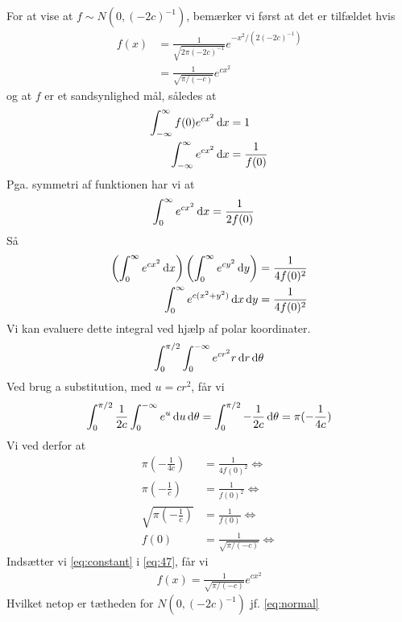 \documentclass{article} %
\begin{document}
 For at vise at \(f\sim N(0,(-2c)^{-1})\), bemærker vi først at det er tilfældet hvis
 \begin{align}
      f(x) & = \frac{1}{\sqrt{2\pi(-2c)^{-1}}}e^{-x^2/(2(-2c)^{-1})} \\
      & = \frac{1}{\sqrt{\pi/(-c)}}e^{cx^2} \label{eq:normal}
  \end{align}
og at \(f\) er et sandsynlighed mål, således at
\begin{align}
    \int_{-\infty}^\infty f(0)e^{cx^2}\dif x & = 1 \\
    \int_{-\infty}^\infty e^{cx^2}\dif x & = \frac{1}{f(0)}
\end{align}
Pga. symmetri af funktionen har vi at
\begin{align}
    \int_{0}^\infty e^{cx^2}\dif x & = \frac{1}{2f(0)}
\end{align}
Så
\begin{align}
    \left(\int_{0}^\infty e^{cx^2}\dif x\right)\left(\int_{0}^\infty e^{cy^2}\dif y\right) & = \frac{1}{4f(0)^2} \\
    \int_{0}^\infty e^{c(x^2+y^2)}\dif x \dif y & = \frac{1}{4f(0)^2}
\end{align}
Vi kan evaluere dette integral ved hjælp af polar koordinater.
\begin{align}
    \int_0^{\pi/2}\int_0^{-\infty}e^{cr^2}r\dif r\dif \theta
\end{align}
Ved brug a substitution, med \(u=cr^2\), får vi
\begin{align}
    \int_0^{\pi/2}\frac{1}{2c}\int_0^{-\infty}e^{u}\dif u\dif \theta = \int_0^{\pi/2} -\frac{1}{2c}\dif \theta=\pi(-\frac{1}{4c})
\end{align}
Vi ved derfor at
\begin{align}
    \pi(-\frac{1}{4c}) & = \frac{1}{4f(0)^2} \Leftrightarrow \\
    \pi(-\frac{1}{c}) & = \frac{1}{f(0)^2} \Leftrightarrow \\
    \sqrt{\pi(-\frac{1}{c})} &=  \frac{1}{f(0)} \Leftrightarrow \\
    f(0) &=  \frac{1}{\sqrt{\pi/(-c)}} \Leftrightarrow \label{eq:constant}
\end{align}
Indsætter vi \cref{eq:constant} i \cref{eq:47}, får vi
\begin{align}
    f(x) = \frac{1}{\sqrt{\pi/(-c)}}e^{cx^2}
\end{align}
Hvilket netop er tætheden for \(N(0,(-2c)^{-1})\) jf. \cref{eq:normal}
\end{document}
